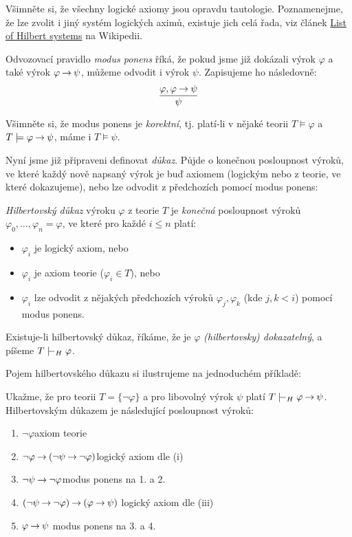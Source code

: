 Všimněte si, že všechny logické axiomy jsou opravdu tautologie. Poznamenejme, že lze zvolit i jiný systém logických aximů, existuje jich celá řada, viz článek \href{https://en.wikipedia.org/wiki/List_of_Hilbert_systems}{List of Hilbert systems} na Wikipedii.

\begin{definition}
Odvozovací pravidlo \emph{modus ponens} říká, že pokud jsme již dokázali výrok $\varphi$ a také výrok $\varphi\mathbin{\rightarrow}\psi$, můžeme odvodit i výrok $\psi$. Zapisujeme ho následovně:
$$
\frac{\varphi, \varphi \mathbin{\rightarrow} \psi}{\psi}
$$ 
\end{definition}

Všimněte si, že modus ponens je \emph{korektní}, tj. platí-li v nějaké teorii $T\models\varphi$ a $T\models\varphi\mathbin{\rightarrow}\psi$, máme i $T\models\psi$.

Nyní jsme již připraveni definovat \emph{důkaz}. Půjde o konečnou posloupnost výroků, ve které každý nově napsaný výrok je buď axiomem (logickým nebo z teorie, ve které dokazujeme), nebo lze odvodit z předchozích pomocí modus ponens:

\begin{definition}
    \emph{Hilbertovský důkaz} výroku $\varphi$ z teorie $T$ je \emph{konečná} posloupnost výroků $\varphi_0, \dots, \varphi_n=\varphi$, ve které pro každé $i\le n$ platí:
    \begin{itemize}
    \item $\varphi_i$ je logický axiom, nebo
    \item $\varphi_i$ je axiom teorie ($\varphi_i \in T$), nebo
    \item $\varphi_i$ lze odvodit z nějakých předchozích výroků $\varphi_j,\varphi_k$ (kde $j,k<i$) pomocí modus ponens.
    \end{itemize}
    Existuje-li hilbertovský důkaz, říkáme, že je $\varphi$ \emph{(hilbertovsky) dokazatelný}, a píšeme $T\proves_H\varphi$.           
\end{definition}

Pojem hilbertovského důkazu si ilustrujeme na jednoduchém příkladě:

\begin{example}
Ukažme, že pro teorii $T=\{\neg\varphi\}$ a pro libovolný výrok $\psi$ platí $T\proves_H\varphi\limplies\psi$. Hilbertovským důkazem je následující posloupnost výroků:
\begin{enumerate}\it
    \item $\neg\varphi$\hfill axiom teorie
    \item $\neg \varphi \mathbin{\rightarrow} (\neg \psi \mathbin{\rightarrow} \neg \varphi)$\hfill logický axiom dle (i)
    \item $\neg \psi \mathbin{\rightarrow} \neg \varphi$\hfill modus ponens na 1. a 2.
    \item $(\neg \psi \mathbin{\rightarrow} \neg \varphi)\mathbin{\rightarrow}(\varphi \mathbin{\rightarrow} \psi)$ \hfill logický axiom dle (iii)
    \item $\varphi \mathbin{\rightarrow} \psi$ \hfill modus ponens na 3. a 4. 
\end{enumerate}
\end{example}

